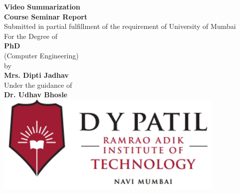 \clearpage%
\begin{center}
{\Huge \bf Video Summarization} \\
\vspace{0.4in}
\textbf {\large Course Seminar Report} \\
\vspace{0.3in}
\large Submitted in partial fulfillment of the requirement of University of Mumbai\\
For the Degree of\\
\vspace{0.5in}
\textbf {PhD}\\
\large(Computer Engineering)\\
\vspace{0.4in}
\large by\\
\vspace{0.2in}
{\large \bf Mrs. Dipti Jadhav}\\
\vspace{0.3in}
\large Under the guidance of\\
\vspace{0.2in}
{\large \bf Dr. Udhav Bhosle}\\
\vspace{0.6in}
\includegraphics{raitlogo.eps}\\

\end{center}
